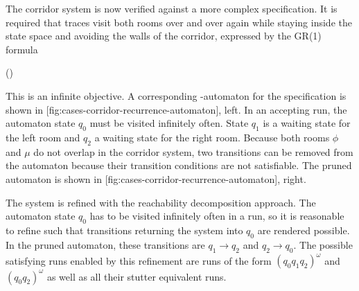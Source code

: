 \startsubsection[title={2-Recurrence and Safety},reference=sec:cases-corridor-recurrence]


    The corridor system is now verified against a more complex specification.
    It is required that traces visit both rooms over and over again while staying inside the state space and avoiding the walls of the corridor, expressed by the GR(1) formula

    \startformula
        \Globally (\neg \theta \wedge \Finally \phi \wedge \Finally \mu ) \EndPeriod
    \stopformula

    This is an infinite objective.
    A corresponding \omega-automaton for the specification is shown in [fig:cases-corridor-recurrence-automaton], left.
    In an accepting run, the automaton state $q_0$ must be visited infinitely often.
    State $q_1$ is a waiting state for the left room and $q_2$ a waiting state for the right room.
    Because both rooms $\phi$ and $\mu$ do not overlap in the corridor system, two transitions can be removed from the automaton because their transition conditions are not satisfiable.
    The pruned automaton is shown in [fig:cases-corridor-recurrence-automaton], right.

    The system is refined with the reachability decomposition approach.
    The automaton state $q_0$ has to be visited infinitely often in a run, so it is reasonable to refine such that transitions returning the system into $q_0$ are rendered possible.
    In the pruned automaton, these transitions are $q_1 \rightarrow q_2$ and $q_2 \rightarrow q_0$.
    The possible satisfying runs enabled by this refinement are runs of the form $(q_0 q_1 q_2)^\omega$ and $(q_0 q_2)^\omega$ as well as all their stutter equivalent runs.


